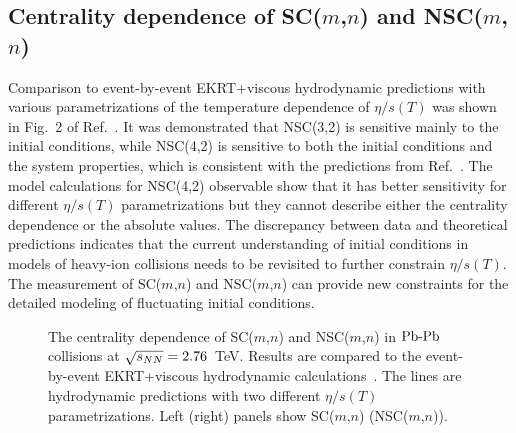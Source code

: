 \subsection{Centrality dependence of SC($m$,$n$) and NSC($m$,$n$)}
\label{sec:theory_allorder}
Comparison to event-by-event EKRT+viscous hydrodynamic predictions with various parametrizations of the temperature dependence of $\eta/s(T)$ was shown in Fig.~2 of Ref.~\cite{ALICE:2016kpq}.
It was demonstrated that NSC(3,2) is sensitive mainly to the initial conditions, while NSC(4,2) is sensitive to both the initial conditions and the system properties, which is consistent with the predictions from Ref.~\cite{Niemi:2012aj}.
The model calculations for NSC(4,2) observable show that it has better sensitivity for different $\eta/s(T)$ parametrizations but they cannot
describe either the centrality dependence or the absolute values. The discrepancy between data and theoretical predictions indicates that the current understanding of initial conditions in models of heavy-ion collisions needs to be revisited to further constrain $\eta/s(T)$.
The measurement of SC($m$,$n$) and NSC($m$,$n$) can provide new constraints for the detailed modeling of fluctuating initial conditions.

\begin{figure}[t!]
            \begin{center}
              \end{center}
        \caption{The centrality dependence of SC($m$,$n$) and NSC($m$,$n$) in $\textnormal{Pb-Pb}$ collisions at $\sqrt{s_{NN}}=2.76$~TeV. Results are compared to the event-by-event EKRT+viscous hydrodynamic calculations~\cite{Niemi:2015qia}. The lines are hydrodynamic predictions with two different $\eta/s(T)$ parametrizations. Left (right) panels show SC($m$,$n$) (NSC($m$,$n$)).}        
        \label{fig:Figure_4}
\end{figure}

